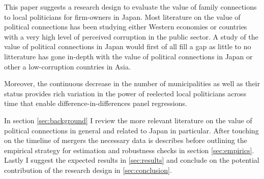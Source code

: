 This paper suggests a research design to evaluate the value of family connections to local politicians for firm-owners in Japan. Most literature on the value of political connections has been studying either Western economies or countries with a very high level of perceived corruption in the public sector. A study of the value of political connections in Japan would first of all fill a gap as little to no litterature has gone in-depth with the value of political connections in Japan or other a low-corruption countries in Asia.

Moreover, the continuous decrease in the number of municipalities as well as their status provides rich variation in the power of reelected local politicians across time that enable difference-in-differences panel regressions.

In section \ref{sec:background} I review the more relevant literature on the value of political connections in general and related to Japan in particular. After touching on the timeline of mergers the necessary data is describes before outlining the empirical strategy for estimation and robustness checks in section \ref{sec:empirics}. Lastly I suggest the expected results in \ref{sec:results} and conclude on the potential contribution of the research design in \ref{sec:conclusion}.
